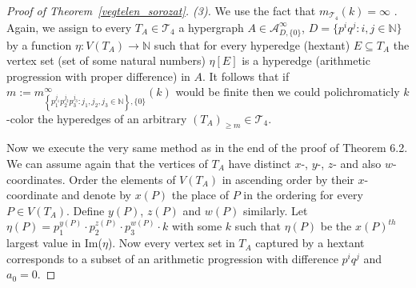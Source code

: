 \documentclass[11pt,oneside]{amsart}
\begin{document}
\begin{proof}[Proof of Theorem~\ref{vegtelen_sorozat}. (3)]
We use the fact that $m_{\mathcal{T}_4}(k) = \infty$ \cite[Theorem 12]{hextant}. Again, we assign to every $T_A \in \mathcal{T}_4$ a hypergraph $A \in \mathcal{A}_{D,\{0\}}^{\infty}$, $D = \{p^iq^j:i,j \in \mathbb{N}\}$ by a function $\eta: V(T_A) \to \mathbb{N}$ such that for every hyperedge (hextant) $E\subseteq T_A$ the vertex set (set of some natural numbers) $\eta[E]$ is a hyperedge (arithmetic progression with proper difference) in $A$. It follows that if $m := m_{\left\{ p_1^{j_1}p_2^{j_2}p_3^{j_3}:j_1,j_2,j_3 \in \mathbb{N}\right\},\{0\}}^{\infty}(k)$ would be finite then we could polichromaticly $k$-color the hyperedges of an arbitrary $(T_A)_{\geq m} \in \mathcal{T}_4$. 

Now we execute the very same method as in the end of the proof of Theorem 6.2. We can assume again that the vertices of $T_A$ have distinct $x$-, $y$-, $z$- and also $w$-coordinates. Order the elements of $V(T_A)$ in ascending order by their $x$-coordinate and denote by $x(P)$ the place of $P$ in the ordering for every $P \in V(T_A)$. Define $y(P)$, $z(P)$ and $w(P)$ similarly. Let $\eta(P) = p_1^{y(P)} \cdot p_2^{z(P)} \cdot p_3^{w(P)} \cdot k$ with some $k$ such that $\eta(P)$ be the $x(P)^{th}$ largest value in {\rm Im}($\eta$). Now every vertex set in $T_A$ captured by a hextant corresponds to a subset of an arithmetic progression with difference $p^iq^j$ and $a_0=0$. 
\end{proof}
\end{document}
